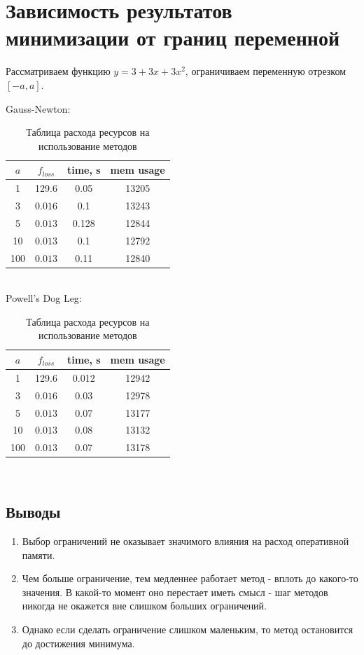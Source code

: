\documentclass[a4paper,14pt,oneside,openany]{memoir}
\begin{document}
\section{Зависимость результатов минимизации от границ переменной}
Рассматриваем функцию $y = 3 + 3x + 3x^2$, ограничиваем переменную отрезком $[-a, a]$.
\FloatBarrier
\begin{table}
\centering
Gauss-Newton: \\
\begin{tabular}{|c|c|c|c| }
	\hline
	$a$ & $f_{loss}$ & time, s & mem usage \\
	\hline
	1 & 129.6 & 0.05 & 13205 \\
	\hline
	3 & $0.016$ & 0.1 & 13243 \\
	\hline
	5 & $0.013$ & 0.128 & 12844 \\
	\hline
	10 & $0.013$ & 0.1 & 12792 \\
	\hline
	100 & $0.013$ & 0.11 & 12840 \\
	\hline
\end{tabular} \\
Powell's Dog Leg: \\
\begin{tabular}{|c|c|c|c| }
	\hline
	$a$ & $f_{loss}$ & time, s & mem usage \\
	\hline
	1 & 129.6 & 0.012 & 12942 \\
	\hline
	3 & $0.016$ & 0.03 & 12978 \\
	\hline
	5 & $0.013$ & 0.07 & 13177 \\
	\hline
	10 & $0.013$ & 0.08 & 13132 \\
	\hline
	100 & $0.013$ & 0.07 & 13178 \\
	\hline
\end{tabular} \\
\caption{Таблица расхода ресурсов на использование методов}
\end{table}
\FloatBarrier
\subsection{Выводы}
\begin{enumerate}
\item Выбор ограничений не оказывает значимого влияния на расход оперативной памяти.
\item Чем больше ограничение, тем медленнее работает метод - вплоть до какого-то значения. В какой-то момент оно перестает иметь смысл - шаг методов никогда не окажется вне слишком больших ограничений.
\item Однако если сделать ограничение слишком маленьким, то метод остановится до достижения минимума.
\end{enumerate}
\newpage
\end{document}
